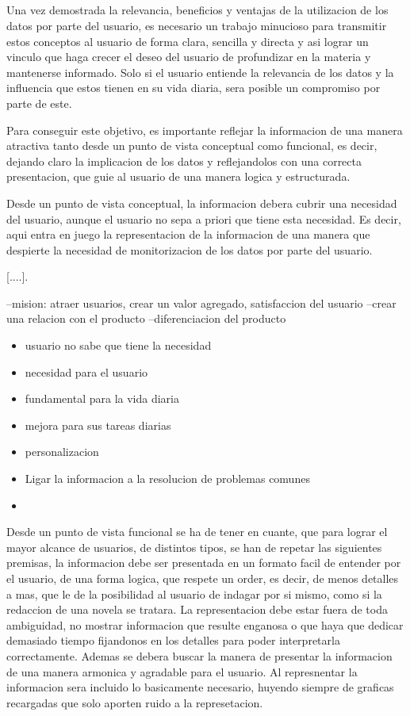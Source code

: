 \subsection*{}
Una vez demostrada la relevancia, beneficios y ventajas de la utilizacion de los datos por parte del usuario, es necesario un trabajo minucioso para
transmitir estos conceptos al usuario de forma clara, sencilla y directa y asi lograr un vinculo que haga crecer el deseo del usuario de profundizar en la materia y
mantenerse informado. 
Solo si el usuario entiende la relevancia de los datos y la influencia que estos tienen en su vida diaria, sera posible un compromiso por parte de este.

Para conseguir este objetivo, es importante reflejar la informacion de una manera atractiva tanto desde un punto de vista conceptual como funcional, 
es decir, dejando claro la implicacion de los datos y reflejandolos con una correcta presentacion, que guie al usuario de una manera logica y estructurada.

Desde un punto de vista conceptual, la informacion debera cubrir una necesidad del usuario, aunque el usuario no sepa a priori que tiene esta necesidad.
Es decir, aqui entra en juego la representacion de la informacion de una manera que despierte la necesidad de monitorizacion de los datos por parte
del usuario.

[....].

--mision: atraer usuarios, crear un valor agregado, satisfaccion del usuario
--crear una relacion con el producto
--diferenciacion del producto 
\begin{itemize}

\item usuario no sabe que tiene la necesidad
\item necesidad para el usuario
\item fundamental para la vida diaria
\item mejora para sus tareas diarias
\item personalizacion
\item Ligar la informacion a la resolucion de problemas comunes
\item \end{itemize}

Desde un punto de vista funcional se ha de tener en cuante, que para lograr el mayor alcance de usuarios, de distintos tipos, se han
de repetar las siguientes premisas,  la informacion debe ser presentada en un formato facil de entender por
el usuario, de una forma logica, que respete un order, es decir, de menos detalles a mas, que le de la posibilidad al usuario de indagar por si mismo, como
si la redaccion de una novela se tratara.
La representacion debe estar fuera de toda ambiguidad, no mostrar informacion que resulte enganosa o que haya que dedicar demasiado tiempo fijandonos
en los detalles para poder interpretarla correctamente.
Ademas se debera buscar la manera de presentar la informacion de una manera armonica y agradable para el usuario.
Al represnentar la informacion sera incluido lo basicamente necesario, huyendo siempre de graficas recargadas que solo aporten ruido a la represetacion.


